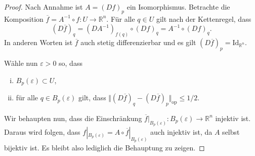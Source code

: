 \documentclass[../main.tex]{subfiles}
\begin{document}
\begin{proof}
  Nach Annahme ist $A = {(Df)}_p$ ein Isomorphismus.
  Betrachte die Komposition
  $\overline f = A^{-1} \circ f \colon U \to \mathbb{R}^n$.
  Für alle $q \in U$
  gilt nach der Kettenregel, dass
  \[
    {(D \overline f)}_q = {(DA^{-1})}_{f(q)} \circ {(Df)}_q
    = A^{-1} \circ {(Df)}_q.
  \]
  In anderen Worten ist $\overline f$ auch stetig differenzierbar
  und es gilt
  \(
    {(D \overline f)}_p = \text{Id}_{\mathbb{R}^n}.
  \)

  Wähle nun $\varepsilon > 0$ so, dass
  \begin{enumerate}[(i)]
    \item $B_p(\varepsilon) \subset U$,
    \item für alle $q \in B_p(\varepsilon)$ gilt, dass
      \(
        \Vert {(D \overline f)}_q - {(D \overline f)}_p \Vert_{\text{op}}
          \leq 1/2
      \).
  \end{enumerate}
  Wir behaupten nun, dass die Einschränkung
  $ \overline f |_{B_p(\varepsilon)} \colon B_p(\varepsilon) \to \mathbb{R}^n$
  injektiv ist.
  Daraus wird folgen, dass $f |_{B_p(\varepsilon)} = A \circ
  \overline f |_{B_p(\varepsilon)}$ auch injektiv ist, da $A$ selbst
  bijektiv ist.
  Es bleibt also lediglich die Behauptung zu zeigen.


\end{proof}
\end{document}
